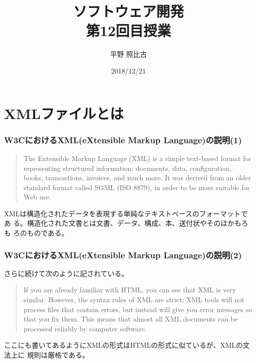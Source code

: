 
\title{ソフトウェア開発\\第12回目授業}
\author{平野 照比古}
\institute{}
\date{2018/12/21}
\newtheorem{Prob}{解説}
\newcommand{\Elm}[1]{\texttt{<#1>}}

\newcommand{\DOMM}{\texttt}
\newcommand{\Event}{\texttt}
\newcommand{\DOMP}{\texttt}
\newcommand{\DOM}{\texttt{DOM}}
\newcommand{\keyitem}{\relax}
\newcommand{\HTML}{HTML文書}

\frame{\maketitle}
\section{XMLファイルとは}
 \begin{frame}[containsverbatim]
  \frametitle{W3CにおけるXML(eXtensible Markup Language)の説明(1)}
\begin{quote}
 The Extensible Markup Language (XML) is a simple text-based format for
 representing structured information: documents, data, configuration,
 books, transactions, invoices, and much more. It was derived from an
 older standard format called SGML (ISO 8879), in order to be more
 suitable for Web use. 
\end{quote}
XMLは構造化されたデータを表現する単純なテキストベースのフォーマットであ
る。構造化された文書とは文書、データ、構成、本、送付状やそのほかもろも
ろのものである。
\end{frame}
\begin{frame}[containsverbatim]
  \frametitle{W3CにおけるXML(eXtensible Markup Language)の説明(2)}

さらに続けて次のように記されている。
\begin{quote}
 If you are already familiar with HTML, you can see that XML is very
 similar. However, the syntax rules of XML are strict: XML tools will
 not process files that contain errors, but instead will give you error
 messages so that you fix them. This means that almost all XML documents
 can be processed reliably by computer software. 

\end{quote}
ここにも書いてあるようにXMLの形式はHTMLの形式に似ているが、XMLの文法上に
規則は厳格である。
\end{frame}
